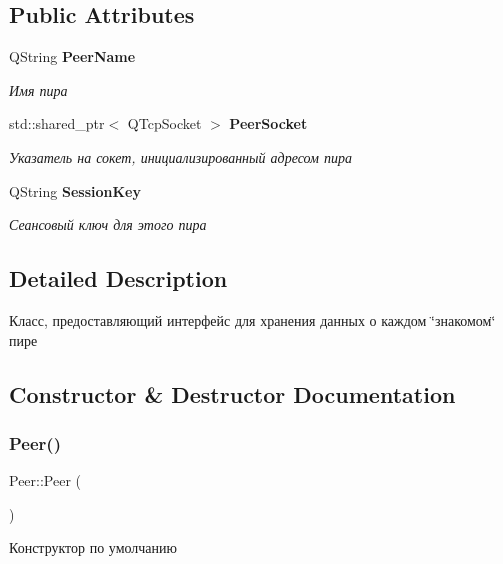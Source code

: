 \subsection*{Public Attributes}
\begin{DoxyCompactItemize}
\item 
Q\+String \textbf{ Peer\+Name}
\begin{DoxyCompactList}\small\item\em Имя пира \end{DoxyCompactList}\item 
std\+::shared\+\_\+ptr$<$ Q\+Tcp\+Socket $>$ \textbf{ Peer\+Socket}
\begin{DoxyCompactList}\small\item\em Указатель на сокет, инициализированный адресом пира \end{DoxyCompactList}\item 
Q\+String \textbf{ Session\+Key}
\begin{DoxyCompactList}\small\item\em Сеансовый ключ для этого пира \end{DoxyCompactList}\end{DoxyCompactItemize}


\subsection{Detailed Description}
Класс, предоставляющий интерфейс для хранения данных о каждом \char`\"{}знакомом\char`\"{} пире 

\subsection{Constructor \& Destructor Documentation}
\mbox{\label{class_peer_a9649fd34528cb532cded43d84a163371}} 
\subsubsection{Peer()\hspace{0.1cm}{\footnotesize\ttfamily [1/3]}}
{\footnotesize\ttfamily Peer\+::\+Peer (\begin{DoxyParamCaption}{ }\end{DoxyParamCaption})}



Конструктор по умолчанию 

\mbox{\label{class_peer_ace891b7f4130166ef1a15e2f5f6698f6}} 
